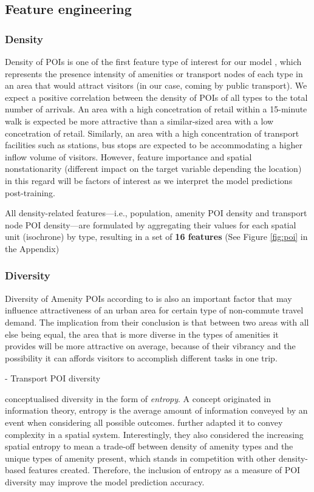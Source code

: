 \subsection{Feature engineering}
\subsubsection*{Density}

Density of POIs is one of the first feature type of interest for our model \citep{cerveroTravelDemand3Ds1997}, which represents the presence intensity of amenities or transport nodes of each type in an area that would attract visitors (in our case, coming by public transport). We expect a positive correlation between the density of POIs of all types to the total number of arrivals. An area with a high concetration of retail within a 15-minute walk is expected be more attractive than a similar-sized area with a low concetration of retail. Similarly, an area with a high concentration of transport facilities such as stations, bus stops are expected to be accommodating a higher inflow volume of visitors. However, feature importance and spatial nonstationarity (different impact on the target variable depending  the location) in this regard will be factors of interest as we interpret the model predictions post-training.

All density-related features---i.e., population, amenity POI density and transport node POI density---are formulated by aggregating their values for each spatial unit (isochrone) by type, resulting in a set of \textbf{16 features} (See Figure \ref{fig:poi} in the Appendix)

\subsubsection*{Diversity}

Diversity of Amenity POIs according to \citet{cerveroTravelDemand3Ds1997} is also an important factor that may influence attractiveness of an urban area for certain type of non-commute travel demand. The implication from their conclusion is that between two areas with all else being equal, the area that is more diverse in the types of amenities it provides will be more attractive on average, because of their vibrancy and the possibility it can affords visitors to accomplish different tasks in one trip.

- Transport POI diversity

\citet{cerveroTravelDemand3Ds1997} conceptualised diversity in the form of \textit{entropy}. A concept originated in information theory, entropy is the average amount of information conveyed by an event when considering all possible outcomes. \citet{battyEntropyComplexitySpatial2014} further adapted it to convey complexity in a spatial system. Interestingly, they also considered the increasing spatial entropy to mean a trade-off between density of amenity types and the unique types of amenity present, which stands in competition with other density-based features created. Therefore, the inclusion of entropy as a measure of POI diversity may improve the model prediction accuracy.

